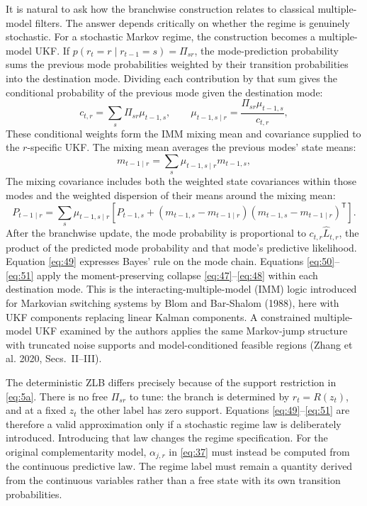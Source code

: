 \documentclass[11pt]{article}
\begin{document}
It is natural to ask how the branchwise construction relates to classical multiple-model filters. The answer depends critically on whether the regime is genuinely stochastic. For a stochastic Markov regime, the construction becomes a multiple-model UKF. If $p(r_t=r\mid r_{t-1}=s)=\Pi_{sr}$, the mode-prediction probability sums the previous mode probabilities weighted by their transition probabilities into the destination mode. Dividing each contribution by that sum gives the conditional probability of the previous mode given the destination mode:
\begin{equation}\label{eq:49}
 c_{t,r}=\sum_s\Pi_{sr}\mu_{t-1,s},
 \qquad
 \mu_{t-1,s\mid r}=\frac{\Pi_{sr}\mu_{t-1,s}}{c_{t,r}},
\end{equation}
These conditional weights form the IMM mixing mean and covariance supplied to the $r$-specific UKF. The mixing mean averages the previous modes' state means:
\begin{equation}\label{eq:50}
 m_{t-1\mid r}=\sum_s\mu_{t-1,s\mid r}m_{t-1,s},
\end{equation}
The mixing covariance includes both the weighted state covariances within those modes and the weighted dispersion of their means around the mixing mean:
\begin{equation}\label{eq:51}
 P_{t-1\mid r}=\sum_s\mu_{t-1,s\mid r}
 \left[P_{t-1,s}+
 (m_{t-1,s}-m_{t-1\mid r})(m_{t-1,s}-m_{t-1\mid r})^{\mathsf T}\right].
\end{equation}
After the branchwise update, the mode probability is proportional to $c_{t,r}\widehat L_{t,r}$, the product of the predicted mode probability and that mode's predictive likelihood. Equation \eqref{eq:49} expresses Bayes' rule on the mode chain. Equations \eqref{eq:50}--\eqref{eq:51} apply the moment-preserving collapse \eqref{eq:47}--\eqref{eq:48} within each destination mode. This is the interacting-multiple-model (IMM) logic introduced for Markovian switching systems by Blom and Bar-Shalom (1988), here with UKF components replacing linear Kalman components. A constrained multiple-model UKF examined by the authors applies the same Markov-jump structure with truncated noise supports and model-conditioned feasible regions (Zhang et al. 2020, Secs.~II--III).

The deterministic ZLB differs precisely because of the support restriction in \eqref{eq:5a}. There is no free $\Pi_{sr}$ to tune: the branch is determined by $r_t=R(z_t)$, and at a fixed $z_t$ the other label has zero support. Equations \eqref{eq:49}--\eqref{eq:51} are therefore a valid approximation only if a stochastic regime law is deliberately introduced. Introducing that law changes the regime specification. For the original complementarity model, $\alpha_{j,r}$ in \eqref{eq:37} must instead be computed from the continuous predictive law. The regime label must remain a quantity derived from the continuous variables rather than a free state with its own transition probabilities.
\end{document}
